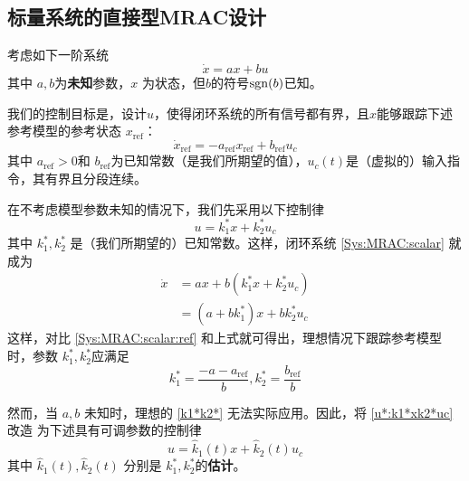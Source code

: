 \subsection{标量系统的直接型MRAC设计}\label{sec:MRAC:scalar:direct}
考虑如下一阶系统
\begin{equation}
  \dot{x} = a  x + b  u \label{Sys:MRAC:scalar}
\end{equation}
其中 $a, b$为{\bf 未知}参数，$x$ 为状态，但$b$的符号$\operatorname{sgn}(b)$已知。

我们的控制目标是，设计$u$，使得闭环系统的所有信号都有界，且$x$能够跟踪下述参考模型的参考状态 $x_{\ensuremath{\operatorname{ref}}}$：
\begin{equation}
  \dot{x}_{\ensuremath{\operatorname{ref}}} = -
  a_{\ensuremath{\operatorname{ref}}} x_{\ensuremath{\operatorname{ref}}} +
  b_{\ensuremath{\operatorname{ref}}} u_c \label{Sys:MRAC:scalar:ref}
\end{equation}
其中 $a_{\ensuremath{\operatorname{ref}}} > 0$和
$b_{\ensuremath{\operatorname{ref}}}$为已知常数（是我们所期望的值），$u_c
(t)$是（虚拟的）输入指令，其有界且分段连续。

在不考虑模型参数未知的情况下，我们先采用以下控制律
\begin{equation}
  u = k^{\ast}_1 x + k^{\ast}_2 u_c \label{u*:k1*xk2*uc}
\end{equation}
其中 $k^{\ast}_1, k^{\ast}_2$ 是（我们所期望的）已知常数。这样，闭环系统 \eqref{Sys:MRAC:scalar} 就成为
\begin{align*}
  \dot{x} & = a  x + b  (k^{\ast}_1 x + k^{\ast}_2 u_c)\\
  & = (a + b  k^{\ast}_1)  x + b  k^{\ast}_2 u_c
\end{align*}
这样，对比 \eqref{Sys:MRAC:scalar:ref} 和上式就可得出，理想情况下跟踪参考模型时，参数
$k^{\ast}_1, k^{\ast}_2$应满足
\begin{equation}
  k^{\ast}_1 = \frac{-a - a_{\ensuremath{\operatorname{ref}}}}{b}, k^{\ast}_2 =
  \frac{b_{\ensuremath{\operatorname{ref}}}}{b} \label{k1*k2*}
\end{equation}

然而，当 $a, b$ 未知时，理想的 \eqref{k1*k2*} 无法实际应用。因此，将 \eqref{u*:k1*xk2*uc} 改造
为下述具有可调参数的控制律
\begin{equation}
  u = \hat{k}_1 (t) x + \hat{k}_2 (t) u_c \label{u:k1xk2uc}
\end{equation}
其中 $\hat{k}_1 (t), \hat{k}_2 (t)$ 分别是 $k^{\ast}_1,k^{\ast}_2$的{\bf 估计}。

